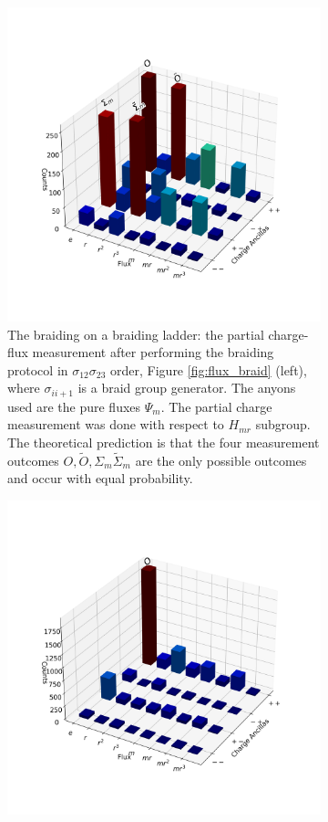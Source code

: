 \documentclass[a4paper,twocolumn,11pt, accepted=2024-06-14]{quantumarticle}
\begin{document}
\begin{figure}
\begin{subfigure}{0.47\textwidth}
    \includegraphics[width=\linewidth]{Figures/braid_fusion.png}
    \caption{The braiding on a braiding ladder: the partial charge-flux measurement after performing the braiding protocol in $\sigma_{12}\sigma_{23}$ order, Figure \ref{fig:flux_braid} (left), where $\sigma_{ii+1}$ is a braid group generator. The anyons used are the pure fluxes $\Psi_m$. The partial charge measurement was done with respect to $H_{mr}$ subgroup. The theoretical prediction is that the four measurement outcomes $O,\tilde O,\Sigma_m \tilde{\Sigma}_m$ are the only possible outcomes and occur with equal probability.} 
    \label{fig:braid_fuse}
\end{subfigure}\hfill
\begin{subfigure}{0.47\textwidth}
    \includegraphics[width=\linewidth]{Figures/braid_link.png}

\end{subfigure}
\end{figure}
\end{document}
